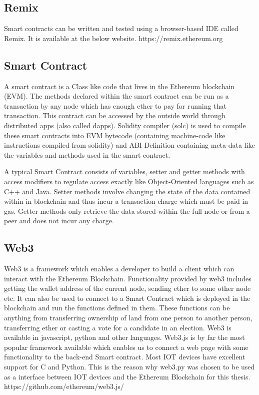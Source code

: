 \documentclass[11pt,openright]{report}
\begin{document}
\subsection{Remix}
Smart contracts can be written and tested using a browser-based IDE called Remix. It is available at the below website.
https://remix.ethereum.org

\subsection{Smart Contract}
A smart contract is a Class like code that lives in the Ethereum blockchain (EVM). The methods declared within the smart contract can be run as a transaction by any node which has enough ether to pay for running that transaction. This contract can be accessed by the outside world through distributed apps (also called dapps). Solidity compiler (solc) is used to compile these smart contracts into EVM bytecode (containing machine-code like instructions compiled from solidity) and ABI Definition containing meta-data like the variables and methods used in the smart contract. 

A typical Smart Contract consists of variables, setter and getter methods with access modifiers to regulate access exactly like Object-Oriented languages such as C++ and Java. Setter methods involve changing the state of the data contained within in blockchain and thus incur a transaction charge which must be paid in gas. Getter methods only retrieve the data stored within the full node or from a peer and does not incur any charge.

\subsection{Web3}
Web3 is a framework which enables a developer to build a client which can interact with the Ethereum Blockchain. Functionality provided by web3 includes getting the wallet address of the current node, sending ether to some other node etc. It can also be used to connect to a Smart Contract which is deployed in the blockchain and run the functions defined in them. These functions can be anything from transferring ownership of land from one person to another person, transferring ether or casting a vote for a candidate in an election. Web3 is available in javascript, python and other languages. Web3.js is by far the most popular framework available which enables us to connect a web page with some functionality to the back-end Smart contract. Most IOT devices have excellent support for C and Python. This is the reason why web3.py was chosen to be used as a interface between IOT devices and the Ethereum Blockchain for this thesis.
https://github.com/ethereum/web3.js/
\end{document}
